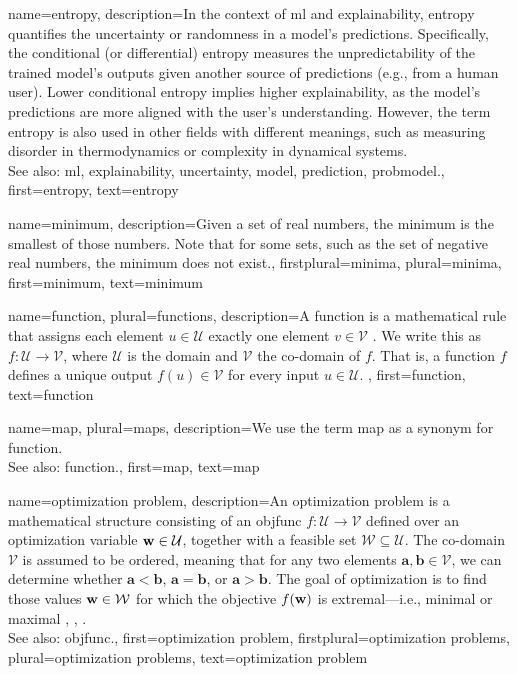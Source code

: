 {name={entropy},
	description={In the context of \gls{ml} and \gls{explainability}, entropy quantifies the \gls{uncertainty} or randomness in a \gls{model}’s \glspl{prediction}. 
		Specifically, the conditional (or differential) entropy measures the unpredictability of the trained \gls{model}’s outputs given another source of \glspl{prediction} 
		(e.g., from a human user). Lower conditional entropy implies higher \gls{explainability}, as the \gls{model}’s \glspl{prediction} are more aligned with the 
		user’s understanding. However, the term entropy is also used in other fields with 
		different meanings, such as measuring disorder in thermodynamics or complexity in dynamical systems. \\
		See also: \gls{ml}, \gls{explainability}, \gls{uncertainty}, \gls{model}, \gls{prediction}, \gls{probmodel}.},
	first={entropy},
	text={entropy}
}

{name=minimum,
	description={Given a set of real numbers, the minimum is the smallest of those numbers.
		Note that for some sets, such as the set of negative real numbers, the minimum does not exist.},
	firstplural={minima}, 
 	plural={minima},
	first={minimum},
	text={minimum}
}

{name={function}, plural={functions}, 
	description={A function is a mathematical rule that assigns each 
		  element $u \in \mathcal{U}$ exactly one element $v \in \mathcal{V}$ \cite{RudinBookPrinciplesMatheAnalysis}. 
		  We write this as $f: \mathcal{U} \rightarrow \mathcal{V}$, where $\mathcal{U}$ is the domain 
		  and $\mathcal{V}$ the co-domain of $f$. That is, a function $f$ defines a unique 
		  output $f(u) \in \mathcal{V}$ for every input $u \in \mathcal{U}$. 
	},
	first={function},
	text={function}
}


{name={map}, plural={maps}, 
	description={We use the term map as a synonym for \gls{function}.
	\\
	See also: \gls{function}.},
	first={map},
	text={map}
}


{name={optimization problem}, 
	description={An optimization problem is a mathematical 
		   structure consisting of an \gls{objfunc} $f: \mathcal{U} \rightarrow \mathcal{V}$ 
		   defined over an optimization variable ${\bf w} \in \mathcal{U}$, together with a 
		   feasible set $\mathcal{W} \subseteq \mathcal{U}$. The co-domain $\mathcal{V}$ is 
		   assumed to be ordered, meaning that for any two elements $\mathbf{a}, \mathbf{b} \in \mathcal{V}$, 
		   we can determine whether $\mathbf{a} < \mathbf{b}$, $\mathbf{a} = \mathbf{b}$, 
		   or $\mathbf{a} > \mathbf{b}$. The goal of optimization is to find those values ${\bf w} \in \mathcal{W}$ 
		   for which the objective $f({\bf w})$ is extremal—i.e., minimal or maximal \cite{BoydConvexBook}, \cite{nesterov04}, \cite{BertsekasNonLinProgr}.
		   \\
		   See also: \gls{objfunc}.},
	first={optimization problem},
	firstplural={optimization problems}, 
	plural={optimization problems}, 
	text={optimization problem}
}

